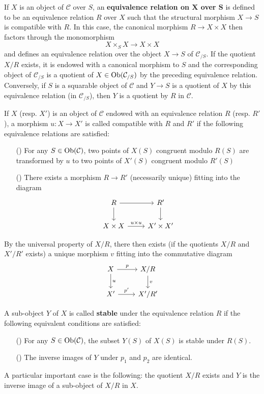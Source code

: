 If $X$ is an object of $\mathcal{C}$ over $S$, an \textbf{equivalence relation on $\bm{X}$ over $\bm{S}$} is defined to be an equivalence relation $R$ over $X$ such that the structural morphism $X\to S$ is compatible with $R$. In this case, the canonical morphism $R\to X\times X$ then factors through the monomorphism
\[X\times_SX\to X\times X\]
and defines an equivalence relation over the object $X\to S$ of $\mathcal{C}_{/S}$. If the quotient $X/R$ exists, it is endowed with a canonical morphism to $S$ and the corresponding object of $\mathcal{C}_{/S}$ is a quotient of $X\in\mathrm{Ob}(\mathcal{C}_{/S})$ by the preceding equivalence relation. Conversely, if $S$ is a squarable object of $\mathcal{C}$ and $Y\to S$ is a quotient of $X$ by this equivalence relation (in $\mathcal{C}_{/S}$), then $Y$ is a quotient by $R$ in $\mathcal{C}$.

\begin{definition}
If $X$ (resp. $X'$) is an object of $\mathcal{C}$ endowed with an equivalence relation $R$ (resp. $R'$), a morphism $u:X\to X'$ is called compatible with $R$ and $R'$ if the following equivalence relations are satisfied:
\begin{enumerate}
    \item[(\rmnum{1})] For any $S\in\mathrm{Ob}(\mathcal{C})$, two points of $X(S)$ congruent modulo $R(S)$ are transformed by $u$ to two points of $X'(S)$ congruent modulo $R'(S)$
    \item[(\rmnum{2})] There exists a morphism $R\to R'$ (necessarily unique) fitting into the diagram
    \[\begin{tikzcd}
    R\ar[r]\ar[d]&R'\ar[d]\\
    X\times X\ar[r,"u\times u"]&X'\times X'
    \end{tikzcd}\]
\end{enumerate}
By the universal property of $X/R$, there then exists (if the quotients $X/R$ and $X'/R'$ exists) a unique morphism $v$ fitting into the commutative diagram
\[\begin{tikzcd}
X\ar[r,"p"]\ar[d,"u"]&X/R\ar[d,"v"]\\
X'\ar[r,"p'"]&X'/R'
\end{tikzcd}\]
\end{definition}

\begin{definition}
A sub-object $Y$ of $X$ is called \textbf{stable} under the equivalence relation $R$ if the following equivalent conditions are satisfied:
\begin{enumerate}
    \item[(\rmnum{1})] For any $S\in\mathrm{Ob}(\mathcal{C})$, the subset $Y(S)$ of $X(S)$ is stable under $R(S)$.
    \item[(\rmnum{2})] The inverse images of $Y$ under $p_1$ and $p_2$ are identical. 
\end{enumerate}
\end{definition}
A particular important case is the following: the quotient $X/R$ exists and $Y$ is the inverse image of a sub-object of $X/R$ in $X$.

